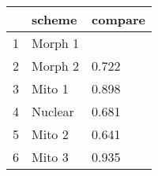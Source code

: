 \begin{table}[ht]
\centering
\begin{tabular}{rll}
  \hline
 & scheme & compare \\ 
  \hline
1 & Morph 1 &  \\ 
  2 & Morph 2 & 0.722 \\ 
  3 & Mito 1 & 0.898 \\ 
  4 & Nuclear & 0.681 \\ 
  5 & Mito 2 & 0.641 \\ 
  6 & Mito 3 & 0.935 \\ 
   \hline
\end{tabular}
\end{table}
